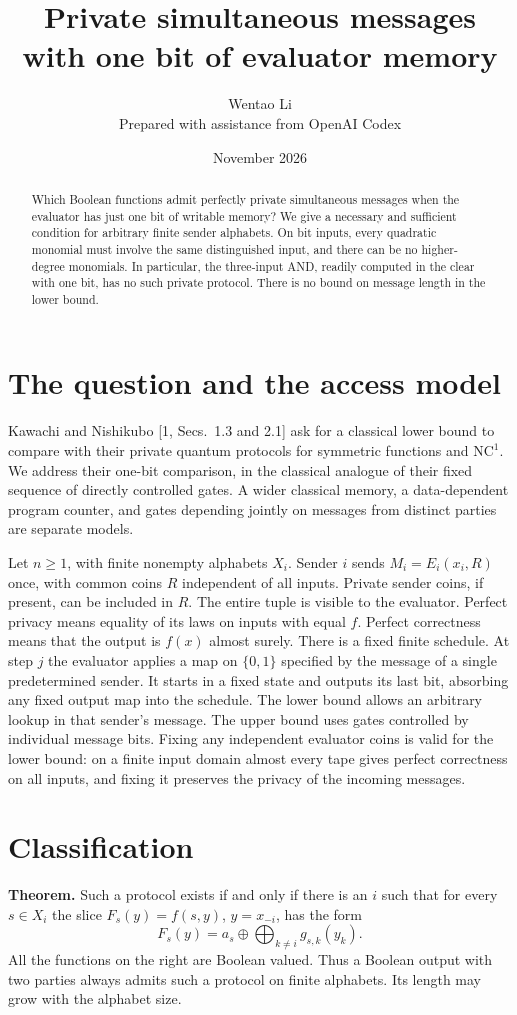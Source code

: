 \documentclass[11pt]{article}
\title{Private simultaneous messages with one bit of evaluator memory}
\author{Wentao Li\\[2pt]\small Prepared with assistance from OpenAI Codex}
\date{November 2026}
\begin{document}
\maketitle
\begin{abstract}
Which Boolean functions admit perfectly private simultaneous messages when the evaluator has just one bit of writable memory? We give a necessary and sufficient condition for arbitrary finite sender alphabets. On bit inputs, every quadratic monomial must involve the same distinguished input, and there can be no higher-degree monomials. In particular, the three-input AND, readily computed in the clear with one bit, has no such private protocol. There is no bound on message length in the lower bound.
\end{abstract}
\section{The question and the access model}
Kawachi and Nishikubo [1, Secs.~1.3 and 2.1] ask for a classical lower bound to compare with their private quantum protocols for symmetric functions and $\mathrm{NC}^1$. We address their one-bit comparison, in the classical analogue of their fixed sequence of directly controlled gates. A wider classical memory, a data-dependent program counter, and gates depending jointly on messages from distinct parties are separate models.

Let $n\ge1$, with finite nonempty alphabets $X_i$. Sender $i$ sends $M_i=E_i(x_i,R)$ once, with common coins $R$ independent of all inputs. Private sender coins, if present, can be included in $R$. The entire tuple is visible to the evaluator. Perfect privacy means equality of its laws on inputs with equal $f$. Perfect correctness means that the output is $f(x)$ almost surely. There is a fixed finite schedule. At step $j$ the evaluator applies a map on $\{0,1\}$ specified by the message of a single predetermined sender. It starts in a fixed state and outputs its last bit, absorbing any fixed output map into the schedule. The lower bound allows an arbitrary lookup in that sender's message. The upper bound uses gates controlled by individual message bits. Fixing any independent evaluator coins is valid for the lower bound: on a finite input domain almost every tape gives perfect correctness on all inputs, and fixing it preserves the privacy of the incoming messages.

\section{Classification}
\textbf{Theorem.} Such a protocol exists if and only if there is an $i$ such that for every $s\in X_i$ the slice $F_s(y)=f(s,y)$, $y=x_{-i}$, has the form
\[
 F_s(y)=a_s\oplus\bigoplus_{k\ne i}g_{s,k}(y_k).
\]
All the functions on the right are Boolean valued. Thus a Boolean output with two parties always admits such a protocol on finite alphabets. Its length may grow with the alphabet size.
\end{document}
